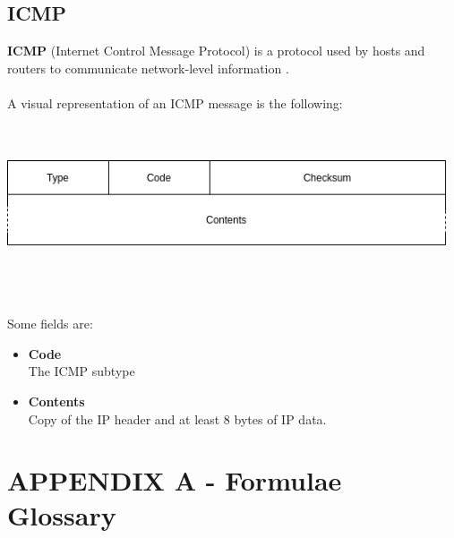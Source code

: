 \documentclass{article}
\begin{document}
\subsection{ICMP}
\textbf{ICMP} (Internet Control Message Protocol) is a protocol used by hosts and routers to communicate network-level information . \\ \\
A visual representation of an ICMP message is the following: \\ \\ \\
\centerline{\includegraphics[width=13cm]{./assets/icmp.png}} \\ \\ \\
Some fields are:
\begin{itemize}
	\item \textbf{Code}
	\vspace{.2cm} \\
	The ICMP subtype
	
	\item \textbf{Contents}
	\vspace{.2cm} \\
	Copy of the IP header and at least 8 bytes of IP data.
\end{itemize}


\newpage

\section{APPENDIX A - Formulae Glossary}
\end{document}
